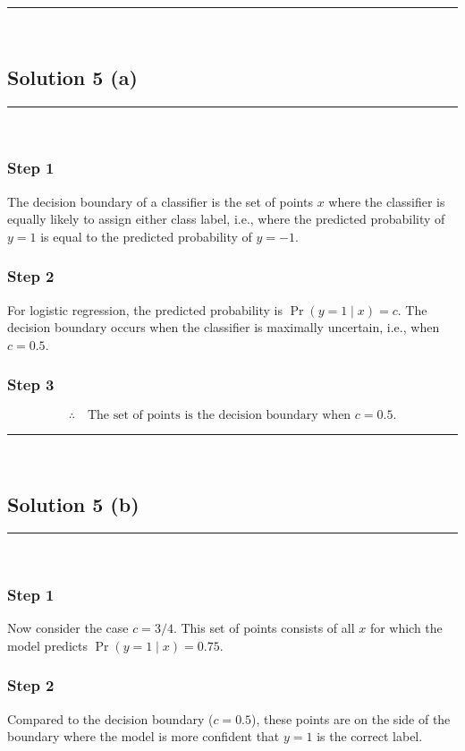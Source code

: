 \documentclass{article}
\begin{document}
\noindent\rule{\textwidth}{0.4pt}\\

\newpage

\subsection*{Solution 5 (a)}
\noindent\rule{\textwidth}{0.4pt}\\

\subsubsection*{Step 1}
\parbox{\textwidth}{
The decision boundary of a classifier is the set of points $x$ where the classifier is equally likely to assign either class label, i.e., where the predicted probability of $y=1$ is equal to the predicted probability of $y=-1$.
}

\subsubsection*{Step 2}
\parbox{\textwidth}{
For logistic regression, the predicted probability is $\operatorname{Pr}(y=1 \mid x) = c$. The decision boundary occurs when the classifier is maximally uncertain, i.e., when $c = 0.5$.
}

\subsubsection*{Step 3}
\parbox{\textwidth}{
\[
\therefore \quad \text{The set of points is the decision boundary when } c = 0.5.
\]
}

\noindent\rule{\textwidth}{0.4pt}\\

\newpage

\subsection*{Solution 5 (b)}
\noindent\rule{\textwidth}{0.4pt}\\

\subsubsection*{Step 1}
\parbox{\textwidth}{
Now consider the case $c = 3/4$. This set of points consists of all $x$ for which the model predicts $\operatorname{Pr}(y=1 \mid x) = 0.75$.
}

\subsubsection*{Step 2}
\parbox{\textwidth}{
Compared to the decision boundary ($c = 0.5$), these points are on the side of the boundary where the model is more confident that $y=1$ is the correct label.
}
\end{document}
